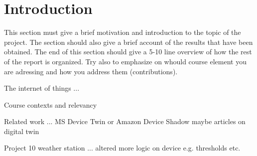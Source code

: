 \section{Introduction}
This section must give a brief motivation and
introduction to the topic of the project. The section should also give a brief account of the
results that have been obtained. The end of this section should give a 5-10 line overview of
how the rest of the report is organized. Try also to emphasize on whould course element
you are adressing and how you address them (contributions).

The internet of things ...

Course contexts and relevancy

Related work ...  MS Device Twin or Amazon Device Shadow maybe articles on digital twin 

Project 10 weather station ... altered more logic on device e.g. thresholds etc.
\pagebreak

